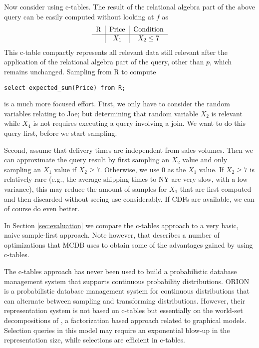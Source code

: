 \begin{example}
Now consider using c-tables. The result of the relational algebra part of the
above query can be easily computed without looking at $f$ as
\[
\begin{tabular}{c|c|c}
R & Price & Condition \\
\hline
& $X_1$ & $X_2 \le 7$ \\
\end{tabular}
\]
This c-table compactly represents all relevant data still relevant after the
application of the relational algebra part of the query, other than $p$,
which remains unchanged.
Sampling from R to compute
\begin{verbatim}
select expected_sum(Price) from R;
\end{verbatim}
is a much more focused effort.
First, we only have to consider the random variables relating to Joe;
but determining that random variable $X_2$ is relevant while $X_4$
is not requires
executing a query involving a join. We want to do this query first, before
we start sampling.

Second, assume that delivery times are
independent from sales volumes. Then we can approximate the
query result
by first sampling an $X_2$ value and only sampling an $X_1$ value if $X_2 \ge 7$.
Otherwise, we use $0$ as the $X_1$ value.
If $X_2 \ge 7$ is relatively rare (e.g., the average shipping times to NY are
very slow, with a low variance), this may reduce the amount of samples
for $X_1$ that are first computed and then discarded without seeing use
considerably.
If CDFs are available, we can of course do even better.

In Section \ref{sec:evaluation} we compare the c-tables approach to a very basic, 
naive sample-first approach.  Note however, that \cite{MCDB} describes a number of 
optimizations that MCDB uses to obtain some of the advantages gained by using c-tables.
%
\punto
\end{example}


The  c-tables  approach has  never  been used  to build  a
probabilistic  database  management  system that  supports  continuous
probability  distributions.
%
ORION \cite{ORION} is a probabilistic database management system for
continuous distributions that can alternate between sampling
and transforming distributions. However, their representation
system is not based on c-tables but essentially on the
world-set decompositions of \cite{AKO07WSD}, a factorization
based approach related to graphical models.
Selection queries in this model may require an exponential blow-up in the
representation size, while selections are efficient in c-tables.

